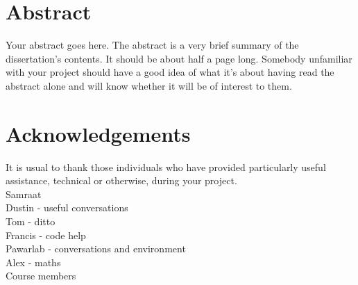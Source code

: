 \documentclass[a4paper]{article} %
\begin{document}
\section*{Abstract}\thispagestyle{empty}
    Your abstract goes here. The abstract is a very brief summary of the dissertation's contents. It should be about half a page long. Somebody unfamiliar with your project should have a good idea of what it's about having read the abstract alone and will know whether it will be of interest to them.

\section*{Acknowledgements}\thispagestyle{empty}
    It is usual to thank those individuals who have provided particularly useful assistance, technical or otherwise, during your project. \\
    Samraat \\
    Dustin - useful conversations \\
    Tom - ditto \\
    Francis - code help \\
    Pawarlab - conversations and environment \\
    Alex - maths \\
    Course members \\

\newpage\tableofcontents\thispagestyle{empty}

\newpage\listoffigures\thispagestyle{empty}

\newpage\listoftables\thispagestyle{empty}
\end{document}
